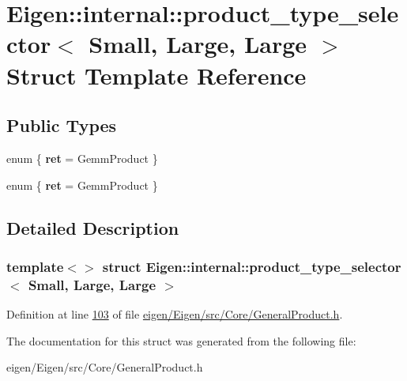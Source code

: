 \hypertarget{struct_eigen_1_1internal_1_1product__type__selector_3_01_small_00_01_large_00_01_large_01_4}{}\section{Eigen\+:\+:internal\+:\+:product\+\_\+type\+\_\+selector$<$ Small, Large, Large $>$ Struct Template Reference}
\label{struct_eigen_1_1internal_1_1product__type__selector_3_01_small_00_01_large_00_01_large_01_4}
\subsection*{Public Types}
\begin{DoxyCompactItemize}
\item 
\mbox{\label{struct_eigen_1_1internal_1_1product__type__selector_3_01_small_00_01_large_00_01_large_01_4_a3625faf932eaf7739f158e452cb1e6e5}} 
enum \{ {\bfseries ret} = Gemm\+Product
 \}
\item 
\mbox{\label{struct_eigen_1_1internal_1_1product__type__selector_3_01_small_00_01_large_00_01_large_01_4_a384dd4f80ec722dda9e27def08e2e83f}} 
enum \{ {\bfseries ret} = Gemm\+Product
 \}
\end{DoxyCompactItemize}


\subsection{Detailed Description}
\subsubsection*{template$<$$>$\newline
struct Eigen\+::internal\+::product\+\_\+type\+\_\+selector$<$ Small, Large, Large $>$}



Definition at line \hyperlink{eigen_2_eigen_2src_2_core_2_general_product_8h_source_l00103}{103} of file \hyperlink{eigen_2_eigen_2src_2_core_2_general_product_8h_source}{eigen/\+Eigen/src/\+Core/\+General\+Product.\+h}.



The documentation for this struct was generated from the following file\+:\begin{DoxyCompactItemize}
\item 
eigen/\+Eigen/src/\+Core/\+General\+Product.\+h\end{DoxyCompactItemize}
